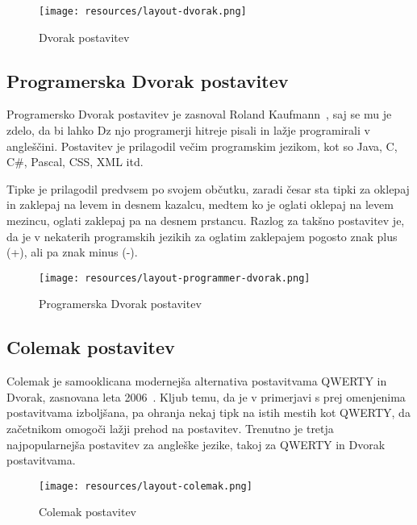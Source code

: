   \begin{figure}[h]
    \centering
    \texttt{[image: resources/layout-dvorak.png]}
    \caption{Dvorak postavitev}
  \end{figure}

  \newpage
  \subsection{Programerska Dvorak postavitev}\label{subsec:programerska-dvorak-postavitev}

  Programersko Dvorak postavitev je zasnoval Roland Kaufmann~\cite{programmer_dvorak},
  saj se mu je zdelo, da bi lahko Dz njo programerji hitreje pisali in lažje programirali v angleščini.
  Postavitev je prilagodil večim programskim jezikom,
  kot so Java, C, C\#, Pascal, CSS, XML itd.

  Tipke je prilagodil predvsem po svojem občutku, zaradi česar sta tipki za oklepaj in zaklepaj na levem in desnem kazalcu,
  medtem ko je oglati oklepaj na levem mezincu, oglati zaklepaj pa na desnem prstancu.
  Razlog za takšno postavitev je, da je v nekaterih programskih jezikih za oglatim zaklepajem pogosto znak plus (+),
  ali pa znak minus (-). \\

  \begin{figure}[h]
    \centering
    \texttt{[image: resources/layout-programmer-dvorak.png]}
    \caption{Programerska Dvorak postavitev}
  \end{figure}

  \subsection{Colemak postavitev}\label{subsec:colemak}

  Colemak je samooklicana modernejša alternativa postavitvama QWERTY in Dvorak,
  zasnovana leta 2006~\cite{colemak}.
  Kljub temu, da je v primerjavi s prej omenjenima postavitvama izboljšana,
  pa ohranja nekaj tipk na istih mestih kot QWERTY, da začetnikom omogoči lažji prehod na postavitev.
  Trenutno je tretja najpopularnejša postavitev za angleške jezike, takoj za QWERTY in Dvorak postavitvama.

  \begin{figure}[h]
    \centering
    \texttt{[image: resources/layout-colemak.png]}
    \caption{Colemak postavitev}
  \end{figure}

